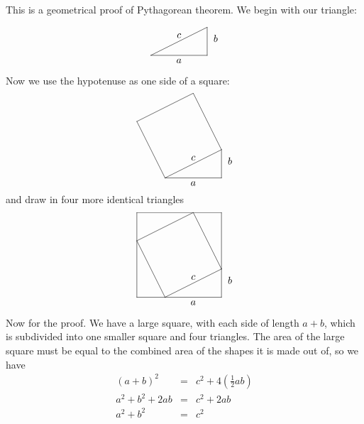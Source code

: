 \documentclass{article}
\begin{document}
This is a geometrical proof of Pythagorean theorem.  We begin with our
triangle:

\[
\begin{xy}
,(0,0)
;(20,0)**@{-}
;(20,10)**@{-}
;(0,0)**@{-}
,(10,-2)*{a}
,(23,6)*{b}
,(10,7)*{c}
\end{xy}
\]

Now we use the hypotenuse as one side of a square:
\[
\begin{xy}
,(0,0)
;(20,0)**@{-}
;(20,10)**@{-}
;(0,0)**@{-}
;(-10,20)**@{-}
;(10,30)**@{-}
;(20,10)**@{-}
,(10,-2)*{a}
,(23,6)*{b}
,(10,7)*{c}
\end{xy}
\]
and draw in four more identical triangles
\[
\begin{xy}
,(0,0)
;(20,0)**@{-}
;(20,10)**@{-}
;(0,0)**@{-}
;(-10,20)**@{-}
;(10,30)**@{-}
;(20,10)**@{-}
;(20,30)**@{-}
;(-10,30)**@{-}
;(-10,0)**@{-}
;(0,0)**@{-}
,(10,-2)*{a}
,(23,6)*{b}
,(10,7)*{c}
\end{xy}
\]

Now for the proof.  We have a large square, with each side of length
$a+b$, which is subdivided into one smaller square and four
triangles.  The area of the large square must be equal to the combined
area of the shapes it is made out of, so we have
\begin{eqnarray}
\left(a+b\right)^2 & = & c^2 + 4\left(\frac{1}{2}ab\right)\nonumber\\
a^2 + b^2 + 2ab & = & c^2 + 2ab \nonumber\\
a^2 + b^2 & = & c^2
\end{eqnarray}
\end{document}
